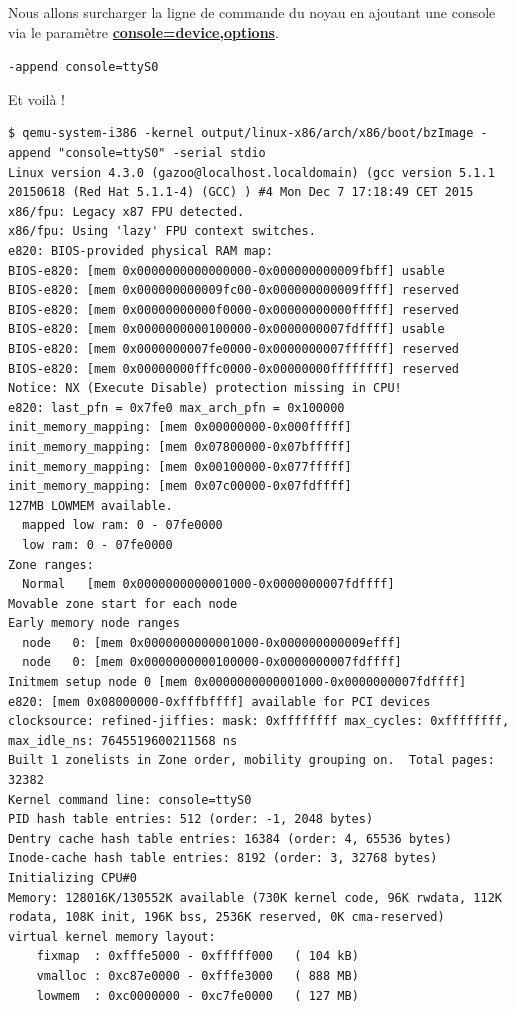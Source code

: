 \documentclass[a4paper]{article}
\begin{document}
Nous allons surcharger la ligne de commande du noyau en ajoutant une console via le paramètre \href{https://www.kernel.org/doc/Documentation/serial-console.txt}{\textbf{console=device,options}}.

\lstset{language=sh}\lstinline{-append console=ttyS0}

Et voilà !

\begin{verbatim}
$ qemu-system-i386 -kernel output/linux-x86/arch/x86/boot/bzImage -append "console=ttyS0" -serial stdio
Linux version 4.3.0 (gazoo@localhost.localdomain) (gcc version 5.1.1 20150618 (Red Hat 5.1.1-4) (GCC) ) #4 Mon Dec 7 17:18:49 CET 2015
x86/fpu: Legacy x87 FPU detected.
x86/fpu: Using 'lazy' FPU context switches.
e820: BIOS-provided physical RAM map:
BIOS-e820: [mem 0x0000000000000000-0x000000000009fbff] usable
BIOS-e820: [mem 0x000000000009fc00-0x000000000009ffff] reserved
BIOS-e820: [mem 0x00000000000f0000-0x00000000000fffff] reserved
BIOS-e820: [mem 0x0000000000100000-0x0000000007fdffff] usable
BIOS-e820: [mem 0x0000000007fe0000-0x0000000007ffffff] reserved
BIOS-e820: [mem 0x00000000fffc0000-0x00000000ffffffff] reserved
Notice: NX (Execute Disable) protection missing in CPU!
e820: last_pfn = 0x7fe0 max_arch_pfn = 0x100000
init_memory_mapping: [mem 0x00000000-0x000fffff]
init_memory_mapping: [mem 0x07800000-0x07bfffff]
init_memory_mapping: [mem 0x00100000-0x077fffff]
init_memory_mapping: [mem 0x07c00000-0x07fdffff]
127MB LOWMEM available.
  mapped low ram: 0 - 07fe0000
  low ram: 0 - 07fe0000
Zone ranges:
  Normal   [mem 0x0000000000001000-0x0000000007fdffff]
Movable zone start for each node
Early memory node ranges
  node   0: [mem 0x0000000000001000-0x000000000009efff]
  node   0: [mem 0x0000000000100000-0x0000000007fdffff]
Initmem setup node 0 [mem 0x0000000000001000-0x0000000007fdffff]
e820: [mem 0x08000000-0xfffbffff] available for PCI devices
clocksource: refined-jiffies: mask: 0xffffffff max_cycles: 0xffffffff, max_idle_ns: 7645519600211568 ns
Built 1 zonelists in Zone order, mobility grouping on.  Total pages: 32382
Kernel command line: console=ttyS0
PID hash table entries: 512 (order: -1, 2048 bytes)
Dentry cache hash table entries: 16384 (order: 4, 65536 bytes)
Inode-cache hash table entries: 8192 (order: 3, 32768 bytes)
Initializing CPU#0
Memory: 128016K/130552K available (730K kernel code, 96K rwdata, 112K rodata, 108K init, 196K bss, 2536K reserved, 0K cma-reserved)
virtual kernel memory layout:
    fixmap  : 0xfffe5000 - 0xfffff000   ( 104 kB)
    vmalloc : 0xc87e0000 - 0xfffe3000   ( 888 MB)
    lowmem  : 0xc0000000 - 0xc7fe0000   ( 127 MB)

\end{verbatim}
\end{document}
